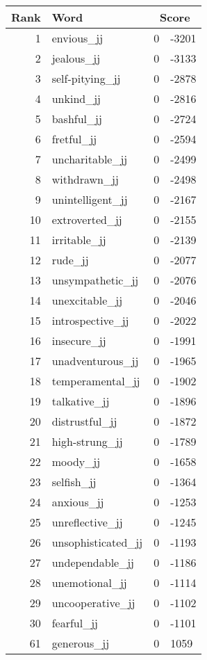 \begin{longtable}[!htbp]{| rlr@{.}l |}
    \hline
    \textbf{Rank} & \textbf{Word} & \multicolumn{2}{c|}{\textbf{Score}} \\
    \hline
    \endhead
    1 & envious\_jj & 0 & -3201 \\
    2 & jealous\_jj & 0 & -3133 \\
    3 & self-pitying\_jj & 0 & -2878 \\
    4 & unkind\_jj & 0 & -2816 \\
    5 & bashful\_jj & 0 & -2724 \\
    6 & fretful\_jj & 0 & -2594 \\
    7 & uncharitable\_jj & 0 & -2499 \\
    8 & withdrawn\_jj & 0 & -2498 \\
    9 & unintelligent\_jj & 0 & -2167 \\
    10 & extroverted\_jj & 0 & -2155 \\
    11 & irritable\_jj & 0 & -2139 \\
    12 & rude\_jj & 0 & -2077 \\
    13 & unsympathetic\_jj & 0 & -2076 \\
    14 & unexcitable\_jj & 0 & -2046 \\
    15 & introspective\_jj & 0 & -2022 \\
    16 & insecure\_jj & 0 & -1991 \\
    17 & unadventurous\_jj & 0 & -1965 \\
    18 & temperamental\_jj & 0 & -1902 \\
    19 & talkative\_jj & 0 & -1896 \\
    20 & distrustful\_jj & 0 & -1872 \\
    21 & high-strung\_jj & 0 & -1789 \\
    22 & moody\_jj & 0 & -1658 \\
    23 & selfish\_jj & 0 & -1364 \\
    24 & anxious\_jj & 0 & -1253 \\
    25 & unreflective\_jj & 0 & -1245 \\
    26 & unsophisticated\_jj & 0 & -1193 \\
    27 & undependable\_jj & 0 & -1186 \\
    28 & unemotional\_jj & 0 & -1114 \\
    29 & uncooperative\_jj & 0 & -1102 \\
    30 & fearful\_jj & 0 & -1101 \\
    61 & generous\_jj & 0 & 1059 \\

\end{longtable}
